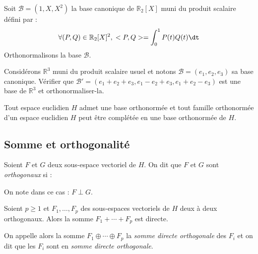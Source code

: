 \documentclass[a4paper,10pt]{report}
\begin{document}
\newpage

\begin{ex} Soit $\mathcal{B}=(1,X,X^2)$ la base canonique de $\mathbb{R}_2[X]$ muni du produit scalaire défini par :
$$ \forall (P,Q) \in \mathbb{R}_2[X]^2, \; <P,Q> = \int_{0}^1 P(t) Q(t) \dt $$
Orthonormalisons la base $\mathcal{B}$.

\vspace{10cm}
\end{ex}

\begin{exa} Considérons $\mathbb{R}^3$ muni du produit scalaire usuel et notons $\mathcal{B}=(e_1,e_2,e_3)$ sa base canonique. Vérifier que $\mathcal{B}'= (e_1+e_2+e_3, e_1-e_2+e_3, e_1+e_2-e_3)$ est une base de $\mathbb{R}^3$ et orthonormaliser-la.
\end{exa}

\begin{cor} Tout espace euclidien $H$ admet une base orthonormée et tout famille orthonormée d'un espace euclidien $H$ peut être complétée en une base orthonormée de $H$.
\end{cor}

\begin{preuve}
\vspace{5cm}
\end{preuve}


\subsection{Somme et orthogonalité}

\begin{defin} Soient $F$ et $G$ deux sous-espace vectoriel de $H$. On dit que $F$ et $G$ sont \textit{orthogonaux} si :
$$ \phantom{\forall (f,g) \in F \times G, \; <f,g>=0}$$
On note dans ce cas : $F \perp G$.
\end{defin}

\begin{defip} Soient $p \geq 1$ et $F_1, \ldots, F_p$ des sous-espaces vectoriels de $H$ deux à deux orthogonaux. Alors la somme $F_1 + \cdots + F_p$ est directe.

\noindent On appelle alors la somme $F_1 \oplus \cdots \oplus F_p$ la \textit{somme directe orthogonale} des $F_i$ et on dit que les $F_i$ sont en \textit{somme directe orthogonale}.
\end{defip}

\begin{preuve}

\vspace{5cm}
\end{preuve}
\end{document}
